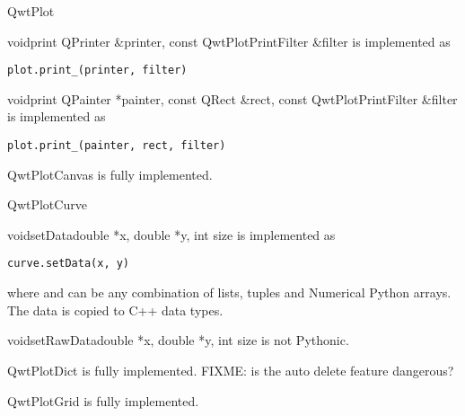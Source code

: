 \documentclass{manual}
\begin{document}
\begin{classdesc*}{QwtPlot}

  \begin{cfuncdesc}{void}{print}{
      QPrinter \&printer, const QwtPlotPrintFilter \&filter}
    is implemented as
    \begin{verbatim}
plot.print_(printer, filter)
    \end{verbatim}
  \end{cfuncdesc}

  \begin{cfuncdesc}{void}{print}{
      QPainter *painter,
      const QRect \&rect,
      const QwtPlotPrintFilter \&filter}
    is implemented as
    \begin{verbatim}
plot.print_(painter, rect, filter)
    \end{verbatim}
  \end{cfuncdesc}

\end{classdesc*}

\begin{classdesc*}{QwtPlotCanvas}
  is fully implemented.
\end{classdesc*}

\begin{classdesc*}{QwtPlotCurve}

  \begin{cfuncdesc}{void}{setData}{double *x, double *y, int size}
    is implemented as
    \begin{verbatim}
curve.setData(x, y)
    \end{verbatim}
    where  and  can be any combination of lists, tuples and
    Numerical Python arrays.  The data is copied to C++ data types.
  \end{cfuncdesc}

  \begin{cfuncdesc}{void}{setRawData}{double *x, double *y, int size}
      is not Pythonic.
  \end{cfuncdesc}

\end{classdesc*}

\begin{classdesc*}{QwtPlotDict}
  is fully implemented.
  FIXME: is the auto delete feature dangerous?
\end{classdesc*}

\begin{classdesc*}{QwtPlotGrid}
  is fully implemented.
\end{classdesc*}
\end{document}
